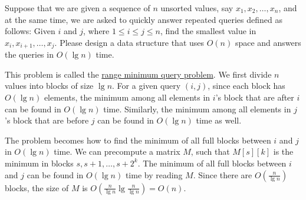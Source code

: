 \begin{Exercise}[origin={NCTU BIOINFO 100},difficulty=1]
Suppose that we are given a sequence of $n$ unsorted values, say $x_1, x_2, \dots, x_n$, and at the same time, we are asked to quickly answer repeated queries defined as follows: Given $i$ and $j$, where $1 \leq i \leq j \leq n$, find the smallest value in $x_i, x_{i+1}, \dots, x_j$. Please design a data structure that uses $O(n)$ space and answers the queries in $O(\lg n)$ time.
\end{Exercise}
\begin{Answer}
This problem is called the \href{https://en.wikipedia.org/wiki/Range_minimum_query}{range minimum query problem}. 
We first divide $n$ values into blocks of size $\lg n$.
For a given query $(i, j)$, since each block has $O(\lg n)$ elements, the minimum among all elements in $i$'s block that are after $i$ can be found in $O(\lg n)$ time.
Similarly, the minimum among all elements in $j$'s block that are before $j$ can be found in $O(\lg n)$ time as well.

The problem becomes how to find the minimum of all full blocks between $i$ and $j$ in $O(\lg n)$ time.
We can precompute a matrix $M$, such that $M[s][k]$ is the minimum in blocks $s, s + 1, \dots, s + 2^k$.
The minimum of all full blocks between $i$ and $j$ can be found in $O(\lg n)$ time by reading $M$.
Since there are $O(\frac{n}{\lg n})$ blocks, the size of $M$ is $O(\frac{n}{\lg n} \lg \frac{n}{\lg n}) = O(n)$.
\end{Answer}

\printbibliography[heading=subbibliography]
